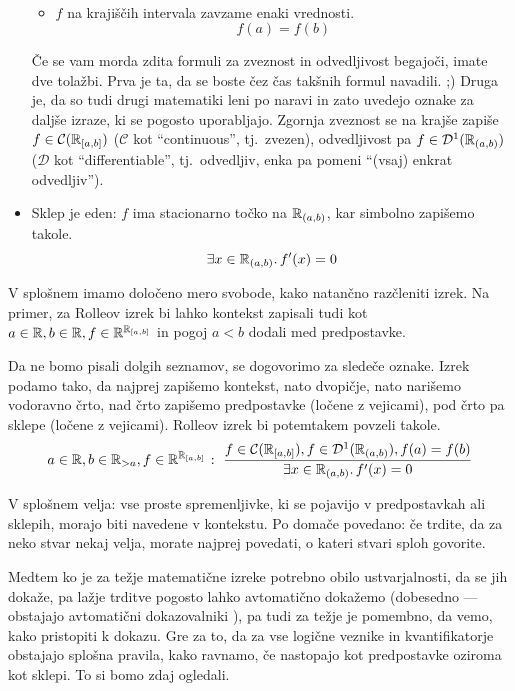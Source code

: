 \begin{itemize}
\begin{itemize}
\begin{multline*}
                                        \end{multline*}
                                \item
                                        $f$ na krajiščih intervala zavzame enaki vrednosti.
                                        \[f(a) = f(b)\]
                        \end{itemize}
                        Če se vam morda zdita formuli za zveznost in odvedljivost begajoči, imate dve tolažbi. Prva je ta, da se boste čez čas takšnih formul navadili. ;) Druga je, da so tudi drugi matematiki leni po naravi in zato uvedejo oznake za daljše izraze, ki se pogosto uporabljajo. Zgornja zveznost se na krajše zapiše $f \in \mathcal{C}({\mathbb{R}}_{[a, b]})$ ($\mathcal{C}$ kot ``continuous'', tj.~zvezen), odvedljivost pa $f \in \mathcal{D}^1({\mathbb{R}}_{(a, b)})$ ($\mathcal{D}$ kot ``differentiable'', tj.~odvedljiv, enka pa pomeni ``(vsaj) enkrat odvedljiv'').
                \item
                        Sklep je eden: $f$ ima stacionarno točko na ${\mathbb{R}}_{(a, b)}$, kar simbolno zapišemo takole.
                        \[\exists x \in {\mathbb{R}}_{(a, b)} .\, f'(x) = 0\]
        \end{itemize}

        V splošnem imamo določeno mero svobode, kako natančno razčleniti izrek. Na primer, za Rolleov izrek bi lahko kontekst zapisali tudi kot $a \in \mathbb{R}, b \in \mathbb{R}, f \in \mathbb{R}^{{\mathbb{R}}_{[a, b]}}$ in pogoj $a < b$ dodali med predpostavke.

        Da ne bomo pisali dolgih seznamov, se dogovorimo za sledeče oznake. Izrek podamo tako, da najprej zapišemo kontekst, nato dvopičje, nato narišemo vodoravno črto, nad črto zapišemo predpostavke (ločene z vejicami), pod črto pa sklepe (ločene z vejicami). Rolleov izrek bi potemtakem povzeli takole.
        \[{a \in \mathbb{R}, b \in \mathbb{R}_{> a}, f \in \mathbb{R}^{{\mathbb{R}}_{[a, b]}}} \;\colon\; \frac{f \in \mathcal{C}({\mathbb{R}}_{[a, b]}), f \in \mathcal{D}^1({\mathbb{R}}_{(a, b)}), f(a) = f(b)}{\exists x \in {\mathbb{R}}_{(a, b)} .\, f'(x) = 0}\]

        V splošnem velja: vse proste spremenljivke, ki se pojavijo v predpostavkah ali sklepih, morajo biti navedene v kontekstu. Po domače povedano: če trdite, da za neko stvar nekaj velja, morate najprej povedati, o kateri stvari sploh govorite.

        Medtem ko je za težje matematične izreke potrebno obilo ustvarjalnosti, da se jih dokaže, pa lažje trditve pogosto lahko avtomatično dokažemo (dobesedno --- obstajajo avtomatični dokazovalniki ), pa tudi za težje je pomembno, da vemo, kako pristopiti k dokazu. Gre za to, da za vse logične veznike in kvantifikatorje obstajajo splošna pravila, kako ravnamo, če nastopajo kot predpostavke oziroma kot sklepi. To si bomo zdaj ogledali.

